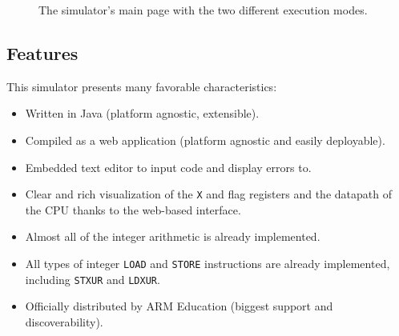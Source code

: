 \begin{figure}[H]
	\centering
	
	\caption{The simulator's main page with the two different execution modes.}
\end{figure}

\subsection*{Features}

This simulator presents many favorable characteristics:

\begin{itemize}[label=\textendash]
	\item Written in Java (platform agnostic, extensible).
	\item Compiled as a web application (platform agnostic and easily deployable).
	\item Embedded text editor to input code and display errors to.
	\item Clear and rich visualization of the \verb|X| and flag registers and the datapath of the CPU thanks to the web-based interface.
	\item Almost all of the integer arithmetic is already implemented.
	\item All types of integer \verb|LOAD| and \verb|STORE| instructions are already implemented, including \verb|STXUR| and \verb|LDXUR|.
	\item Officially distributed by ARM Education (biggest support and discoverability).
\end{itemize}


